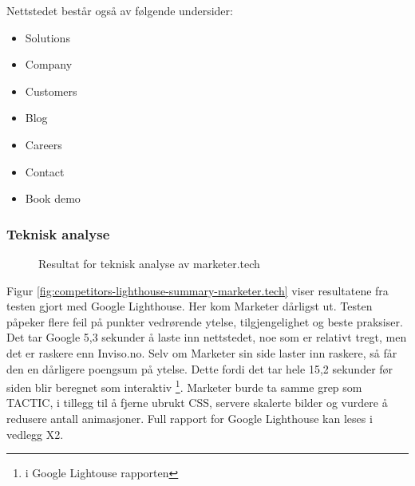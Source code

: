 Nettstedet består også av følgende undersider:
\begin{itemize}
\item Solutions
\item Company
\item Customers
\item Blog
\item Careers 
\item Contact
\item Book demo
\end{itemize}

\subsubsection{Teknisk analyse}
\begin{figure}[H]
    \begin{center}
        
        \label{fig:competitors-tech_analysis-marketer.tech}
        \caption{Resultat for teknisk analyse av marketer.tech}
    \end{center}
\end{figure}

Figur \ref{fig:competitors-lighthouse-summary-marketer.tech} viser resultatene fra testen gjort med Google Lighthouse. Her kom Marketer dårligst ut. Testen påpeker flere feil på punkter vedrørende ytelse, tilgjengelighet og beste praksiser. Det tar Google 5,3 sekunder å laste inn nettstedet, noe som er relativt tregt, men det er raskere enn Inviso.no. Selv om Marketer sin side laster inn raskere, så får den en dårligere poengsum på ytelse. Dette fordi det tar hele 15,2 sekunder før siden blir beregnet som interaktiv \footnote{ i Google Lightouse rapporten}. Marketer burde ta samme grep som TACTIC, i tillegg til å fjerne ubrukt CSS, servere skalerte bilder og vurdere å redusere antall animasjoner.
Full rapport for Google Lighthouse kan leses i vedlegg X2.


